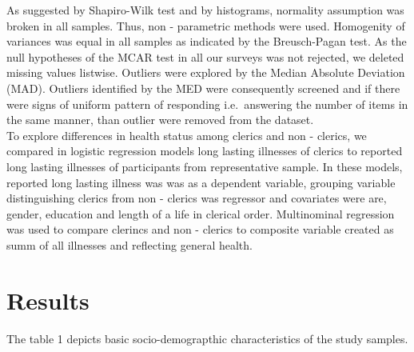 \documentclass[ijerph,article,accept,moreauthors,pdftex]{mdpi}
\begin{document}
As suggested by Shapiro-Wilk test and by histograms, normality
assumption was broken in all samples. Thus, non - parametric methods
were used. Homogenity of variances was equal in all samples as indicated
by the Breusch-Pagan test. As the null hypotheses of the MCAR test in
all our surveys was not rejected, we deleted missing values listwise.
Outliers were explored by the Median Absolute Deviation (MAD). Outliers
identified by the MED were consequently screened and if there were signs
of uniform pattern of responding i.e.~answering the number of items in
the same manner, than outlier were removed from the dataset.\\
To explore differences in health status among clerics and non - clerics,
we compared in logistic regression models long lasting illnesses of
clerics to reported long lasting illnesses of participants from
representative sample. In these models, reported long lasting illness
was was as a dependent variable, grouping variable distinguishing
clerics from non - clerics was regressor and covariates were are,
gender, education and length of a life in clerical order. Multinominal
regression was used to compare clerincs and non - clerics to composite
variable created as summ of all illnesses and reflecting general health.

\hypertarget{results}{%
\section{Results}\label{results}}

The table 1 depicts basic socio-demograpthic characteristics of the
study samples.

\newpage
\end{document}
